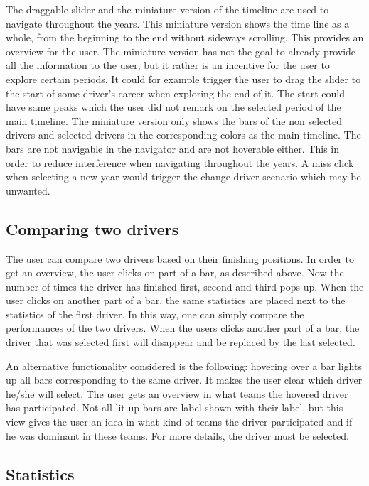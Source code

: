 \documentclass{sigchi}
\begin{document}
The draggable slider and the miniature version of the timeline are used to navigate throughout the years. This miniature version shows the time line as a whole, from the beginning to the end without sideways scrolling. This provides an overview for the user. The miniature version has not the goal to already provide all the information to the user, but it rather is an incentive for the user to explore certain periods. It could for example trigger the user to drag the slider to the start of some driver’s career when exploring the end of it. The start could have same peaks which the user did not remark on the selected period of the main timeline.  The miniature version only shows the bars of the non selected drivers and selected drivers in the corresponding colors as the main timeline. The bars are not navigable in the navigator and are not hoverable either. This in order to reduce interference when navigating throughout the years. A miss click when selecting a new year would trigger the change driver scenario which may be unwanted. 

\subsection{Comparing two drivers}

The user can compare two drivers based on their finishing positions. In order to get an overview, the user clicks on part of a bar, as described above. Now the number of times the driver has finished first, second and third pops up. When the user clicks on another part of a bar, the same statistics are placed next to the statistics of the first driver. In this way, one can simply compare the performances of the two drivers. When the users clicks another part of a bar, the driver that was selected first will disappear and be replaced by the last selected.

An alternative functionality considered is the following: hovering over a bar lights up all bars corresponding to the same driver. It makes the user clear which driver he/she will select. The user gets an overview in what teams the hovered driver has participated. Not all lit up bars are label shown with their label, but this view gives the user an idea in what kind of teams the driver participated and if he was dominant in these teams. For more details, the driver must be selected.

\subsection{Statistics}
\end{document}
